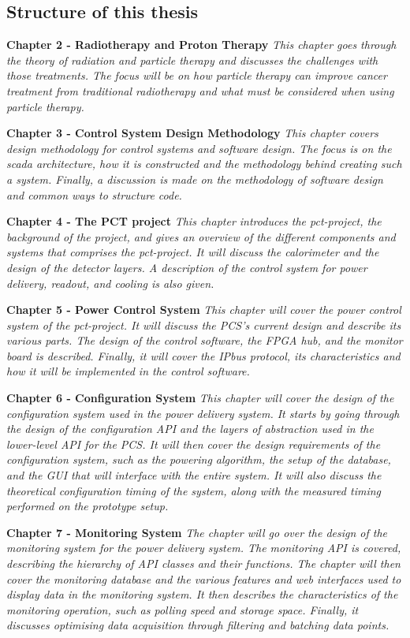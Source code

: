 \documentclass[main.tex]{subfiles}
\begin{document}
\subsection{Structure of this thesis}

\textbf{Chapter 2 - Radiotherapy and Proton Therapy} \textit{This chapter goes through the theory of radiation and particle therapy and discusses the challenges with those treatments. The focus will be on how particle therapy can improve cancer treatment from traditional radiotherapy and what must be considered when using particle therapy.} 

\textbf{Chapter 3 - Control System Design Methodology} \textit{This chapter covers design methodology for control systems and software design. The focus is on the \gls{scada} architecture, how it is constructed and the methodology behind creating such a system. Finally, a discussion is made on the methodology of software design and common ways to structure code.}


\textbf{Chapter 4 - The PCT project} \textit{This chapter introduces the \gls{pct}-project, the background of the project, and gives an overview of the different components and systems that comprises the \gls{pct}-project. It will discuss the calorimeter and the design of the detector layers. A description of the control system for power delivery, readout, and cooling is also given.}

\textbf{Chapter 5 - Power Control System} \textit{This chapter will cover the power control system of the \gls{pct}-project. It will discuss the PCS's current design and describe its various parts. The design of the control software, the FPGA hub, and the monitor board is described. Finally, it will cover the IPbus protocol, its characteristics and how it will be implemented in the control software.}

\textbf{Chapter 6 - Configuration System} \textit{This chapter will cover the design of the configuration system used in the power delivery system. It starts by going through the design of the configuration API and the layers of abstraction used in the lower-level API for the PCS. It will then cover the design requirements of the configuration system, such as the powering algorithm, the setup of the database, and the GUI that will interface with the entire system. It will also discuss the theoretical configuration timing of the system, along with the measured timing performed on the prototype setup.}

\textbf{Chapter 7 - Monitoring System} \textit{The chapter will go over the design of the monitoring system for the power delivery system. The monitoring API is covered, describing the hierarchy of API classes and their functions. The chapter will then cover the monitoring database and the various features and web interfaces used to display data in the monitoring system. It then describes the characteristics of the monitoring operation, such as polling speed and storage space. Finally, it discusses optimising data acquisition through filtering and batching data points.}
\end{document}
